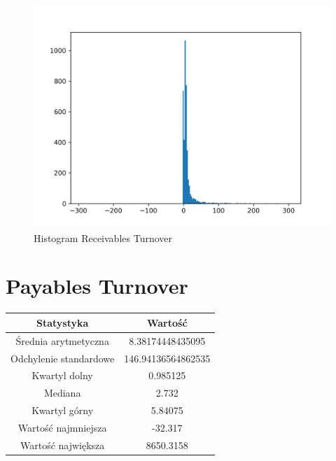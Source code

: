\documentclass{article}
\begin{document}
\begin{figure}[h!]
    \includegraphics[width=\linewidth]{variables/Receivables Turnover.png}
    \caption{Histogram Receivables Turnover }
\end{figure}\section{ Payables Turnover }

\begin{center}
    \begin{tabular}{|c | c|} 
    \hline
    Statystyka & Wartość \\
    \hline\hline
    Średnia arytmetyczna & 8.38174448435095 \\ 
    \hline
    Odchylenie standardowe & 146.94136564862535 \\
    \hline
    Kwartyl dolny & 0.985125 \\
    \hline
    Mediana & 2.732 \\
    \hline
    Kwartyl górny & 5.84075 \\
    \hline
    Wartość najmniejsza & -32.317 \\
    \hline
    Wartość największa & 8650.3158 \\
    \hline
   \end{tabular}
\end{center}
\end{document}
